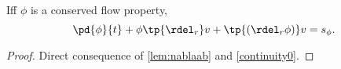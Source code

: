 \begin{thm}
Iff $\phi$ is a conserved flow property,
\begin{equation}
    \label{continuity}
    \pd{\phi}{t} + \phi \tp{\rdel_r} v +  \tp{(\rdel_r \phi)} v = s_\phi.
\end{equation}
\end{thm}
\begin{proof}
    Direct consequence of \autoref{lem:nablaab} and \autoref{continuity0}.
\end{proof}

